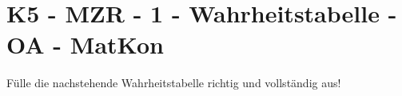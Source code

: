\section{K5 - MZR - 1 - Wahrheitstabelle - OA - MatKon}

\begin{beispiel}[K5 - MZR]{1}
				Fülle die nachstehende Wahrheitstabelle richtig und vollständig aus!
				
				\begin{center}
				\end{center}
\end{beispiel}
